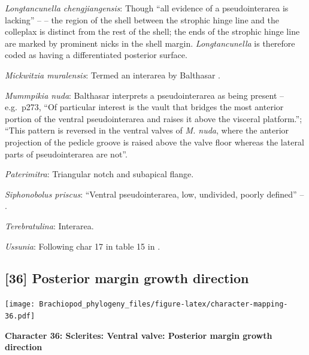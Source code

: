 \documentclass[openany]{book}
\theoremstyle{definition}
\theoremstyle{definition}
\theoremstyle{definition}
\theoremstyle{remark}
\begin{document}
\hypertarget{Longtancunella_chengjiangensis-coding-35}{}
\emph{Longtancunella chengjiangensis}: Though ``all evidence of a
pseudointerarea is lacking'' -- \citet{Zhang2011Theexceptionally} -- the
region of the shell between the strophic hinge line and the colleplax
\citep[fig. 2 in][]{Zhang2011Theexceptionally} is distinct from the rest
of the shell; the ends of the strophic hinge line are marked by
prominent nicks in the shell margin. \emph{Longtancunella} is therefore
coded as having a differentiated posterior surface.

\hypertarget{Mickwitzia_muralensis-coding-35}{}
\emph{Mickwitzia muralensis}: Termed an interarea by Balthasar
\citeyearpar{Balthasar2004Shellstructure}.

\hypertarget{Mummpikia_nuda-coding-35}{}
\emph{Mummpikia nuda}: Balthasar \citeyearpar{Balthasar2008iMummpikia}
interprets a pseudointerarea as being present -- e.g.~p273, ``Of
particular interest is the vault that bridges the most anterior portion
of the ventral pseudointerarea and raises it above the visceral
platform.''; ``This pattern is reversed in the ventral valves of
\emph{M. nuda}, where the anterior projection of the pedicle groove is
raised above the valve floor whereas the lateral parts of
pseudointerarea are not''.

\hypertarget{Paterimitra-coding-35}{}
\emph{Paterimitra}: Triangular notch and subapical flange.

\hypertarget{Siphonobolus_priscus-coding-35}{}
\emph{Siphonobolus priscus}: ``Ventral pseudointerarea, low, undivided,
poorly defined'' -- \citet{Williams2000LinguliformeaCraniiformea}.

\hypertarget{Terebratulina-coding-35}{}
\emph{Terebratulina}: Interarea.

\hypertarget{Ussunia-coding-35}{}
\emph{Ussunia}: Following char 17 in table 15 in
\citet{Williams2000LinguliformeaCraniiformea}.

\subsection*{{[}36{]} Posterior margin growth
direction}\label{posterior-margin-growth-direction}

\texttt{[image: Brachiopod\_phylogeny\_files/figure-latex/character-mapping-36.pdf]}

\textbf{Character 36: Sclerites: Ventral valve: Posterior margin growth
direction}
\end{document}
